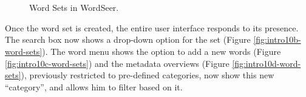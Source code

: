 \documentclass{sig-alternate}
\begin{document}
\begin{enumerate}
\begin{figure}[ht!]
\begin{center}
%
        \\
         \\
        \quad
%
    \end{center}
    \caption{%
       Word Sets in WordSeer. \label{fig:intro10-word-sets}
     }%
\end{figure}
Once the word set is created, the entire user interface responds to its presence. The search box now shows a drop-down option for the set  (Figure \ref{fig:intro10b-word-sets}).  The word menu shows the option to add a new words (Figure \ref{fig:intro10c-word-sets}) and the metadata overviews (Figure \ref{fig:intro10d-word-sets}), previously restricted to pre-defined categories,  now show this new ``category'', and allows him to filter based on it.   


\end{enumerate}
\end{document}
